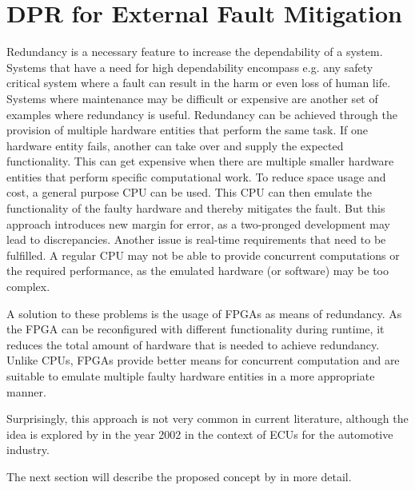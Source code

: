 \section{\gls{DPR} for External Fault Mitigation}\label{ExternalFaults}
Redundancy is a necessary feature to increase the dependability of a system.
Systems that have a need for high dependability encompass e.g. any safety critical system where a fault can result in the harm or even loss of human life.
Systems where maintenance may be difficult or expensive are another set of examples where redundancy is useful.
Redundancy can be achieved through the provision of multiple hardware entities that perform the same task.
If one hardware entity fails, another can take over and supply the expected functionality.
This can get expensive when there are multiple smaller hardware entities that perform specific computational work. 
To reduce space usage and cost, a general purpose \gls{CPU} can be used.
This \gls{CPU} can then emulate the functionality of the faulty hardware and thereby mitigates the fault. 
But this approach introduces new margin for error, as a two-pronged development may lead to discrepancies.
Another issue is real-time requirements that need to be fulfilled.
A regular \gls{CPU} may not be able to provide concurrent computations or the required performance, as the emulated hardware (or software) may be too complex.

A solution to these problems is the usage of \glspl{FPGA} as means of redundancy. 
As the \gls{FPGA} can be reconfigured with different functionality during runtime, it reduces the total amount of hardware that is needed to achieve redundancy.
Unlike \glspl{CPU}, \glspl{FPGA} provide better means for concurrent computation and are suitable to emulate multiple faulty hardware entities in a more appropriate manner. %

Surprisingly, this approach is not very common in current literature, although the idea is explored by \cite{crdl_fail-safe_2002} in the year 2002 in the context of \glspl{ECU} for the automotive industry.

The next section will describe the proposed concept by \cite{crdl_fail-safe_2002} in more detail.

